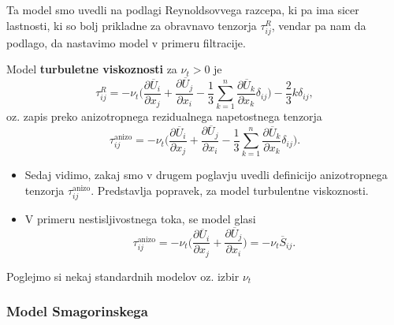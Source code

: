 \documentclass[mat2, tisk]{fmfdelo}
\newcommand{\bd}{\textbf}
\begin{document}
Ta model smo uvedli na podlagi Reynoldsovvega razcepa, ki 
pa ima sicer lastnosti, ki so bolj prikladne za obravnavo 
tenzorja $\tau_{ij}^R$, vendar pa nam da podlago, da nastavimo 
model v primeru filtracije. 

\begin{definicija}
Model \bd{turbuletne viskoznosti} za $\nu_t > 0$ je 
\begin{equation}
\tau_{ij}^R = -\nu_t \Big(\frac{\partial \overline{U}_i}{\partial x_j} + \frac{\partial \overline{U}_j}{\partial x_i}
- \frac{1}{3} \sum_{k=1}^n \frac{\partial \overline{U}_k}{\partial x_k}\delta_{ij}\Big) - \frac{2}{3}k\delta_{ij},
\end{equation}
oz. zapis preko anizotropnega rezidualnega napetostnega tenzorja
\begin{equation}
\tau_{ij}^{\text{anizo}} = -\nu_t \Big(\frac{\partial \overline{U}_i}{\partial x_j} + \frac{\partial \overline{U}_j}{\partial x_i}
- \frac{1}{3} \sum_{k=1}^n \frac{\partial \overline{U}_k}{\partial x_k}\delta_{ij}\Big).
\end{equation}
\end{definicija}

\begin{opomba}
  \hfill 
\begin{itemize}
  \item Sedaj vidimo, zakaj smo v drugem poglavju uvedli definicijo 
  anizotropnega tenzorja $\tau_{ij}^{\text{anizo}}$. Predstavlja popravek, 
  za model turbulentne viskoznosti.
  \item V primeru nestisljivostnega toka, se model glasi 
  $$
  \tau_{ij}^{\text{anizo}} = -\nu_t \Big(\frac{\partial \overline{U}_i}{\partial x_j} + \frac{\partial \overline{U}_j}{\partial x_i}\Big) = -\nu_t \overline{S}_{ij}.
  $$
\end{itemize}
\end{opomba}

Poglejmo si nekaj standardnih modelov oz. izbir $\nu_t$
\subsubsection{Model Smagorinskega} 
\end{document}
